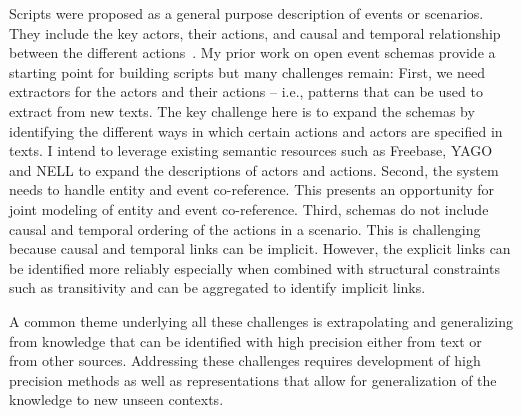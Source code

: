 \documentclass[a4paper,11pt,onecolumn]{article}
\begin{document}
Scripts were proposed as a general purpose description of events or scenarios. They include the key actors, their actions, and causal and temporal relationship between the different actions~\cite{schank-scripts75}. My prior work on open event schemas provide a starting point for building scripts but many challenges remain: First, we need extractors for the actors and their actions -- i.e., patterns that can be used to extract from new texts. The key challenge here is to expand the schemas by identifying the different ways in which certain actions and actors are specified in texts. I intend to leverage existing semantic resources such as Freebase, YAGO and NELL to expand the descriptions of actors and actions. Second, the system needs to handle entity and event co-reference. This presents an opportunity for joint modeling of entity and event co-reference. Third, schemas do not include causal and temporal ordering of the actions in a scenario. This is challenging because causal and temporal links can be implicit. However, the explicit links can be identified more reliably especially when combined with structural constraints such as transitivity and can be aggregated to identify implicit links.

A common theme underlying all these challenges is extrapolating and generalizing from knowledge that can be identified with high precision either from text or from other sources.  Addressing these challenges requires development of high precision methods as well as representations that allow for generalization of the knowledge to new unseen contexts. 



\end{document}
